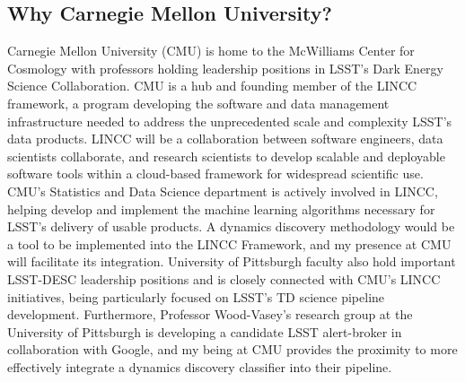 \documentclass[modern]{aastex631}
\begin{document}
\subsection{Why Carnegie Mellon University?}
Carnegie Mellon University (CMU) is home to the McWilliams Center for Cosmology with professors holding leadership positions in LSST's Dark Energy Science Collaboration. 
CMU is a hub and founding member of the LINCC framework, a program developing the software and data management infrastructure needed to address the unprecedented scale and complexity LSST's data products. 
LINCC will be a collaboration between software engineers, data scientists collaborate, and research scientists to develop scalable and deployable software tools within a cloud-based framework for widespread scientific use. 
CMU's Statistics and Data Science department is actively involved in LINCC, helping develop and implement the machine learning algorithms necessary for LSST's delivery of usable products. 
A dynamics discovery methodology would be a tool to be implemented into the LINCC Framework, and my presence at CMU will facilitate its integration. 
University of Pittsburgh faculty also hold important LSST-DESC leadership positions and is closely connected with CMU's LINCC initiatives, being particularly focused on LSST's TD science pipeline development. 
Furthermore, Professor Wood-Vasey's research group at the University of Pittsburgh is developing a candidate LSST alert-broker in collaboration with Google, and my being at CMU provides the proximity to more effectively integrate a dynamics discovery classifier into their pipeline. 

{}

\end{document}
